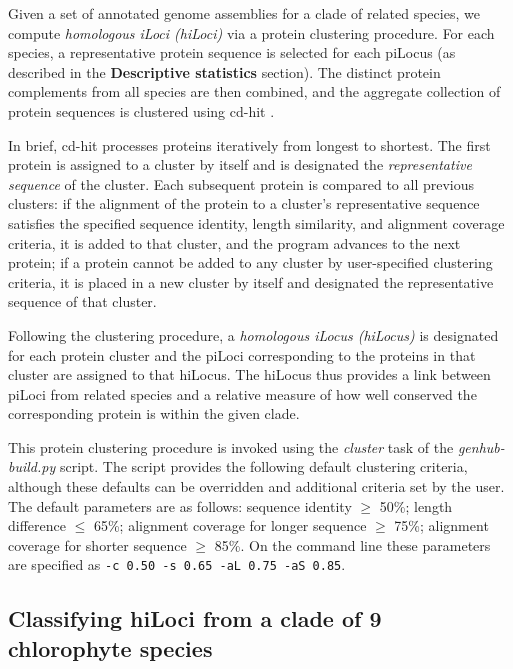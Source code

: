 Given a set of annotated genome assemblies for a clade of related species, we compute \textit{homologous iLoci (hiLoci)} via a protein clustering procedure.
For each species, a representative protein sequence is selected for each piLocus (as described in the \textbf{Descriptive statistics} section).
The distinct protein complements from all species are then combined, and the aggregate collection of protein sequences is clustered using cd-hit \cite{cdhit}.

In brief, cd-hit processes proteins iteratively from longest to shortest.
The first protein is assigned to a cluster by itself and is designated the \textit{representative sequence} of the cluster.
Each subsequent protein is compared to all previous clusters:
if the alignment of the protein to a cluster's representative sequence satisfies the specified sequence identity, length similarity, and alignment coverage criteria, it is added to that cluster, and the program advances to the next protein;
if a protein cannot be added to any cluster by user-specified clustering criteria, it is placed in a new cluster by itself and designated the representative sequence of that cluster.

Following the clustering procedure, a \textit{homologous iLocus (hiLocus)} is designated for each protein cluster and the piLoci corresponding to the proteins in that cluster are assigned to that hiLocus.
The hiLocus thus provides a link between piLoci from related species and a relative measure of how well conserved the corresponding protein is within the given clade.

This protein clustering procedure is invoked using the \textit{cluster} task of the \textit{genhub-build.py} script.
The script provides the following default clustering criteria, although these defaults can be overridden and additional criteria set by the user.
The default parameters are as follows: sequence identity $\geq$ 50\%; length difference $\leq$ 65\%; alignment coverage for longer sequence $\geq$ 75\%; alignment coverage for shorter sequence $\geq$ 85\%.
On the command line these parameters are specified as \texttt{-c 0.50 -s 0.65 -aL 0.75 -aS 0.85}.

\subsection*{Classifying hiLoci from a clade of 9 chlorophyte species}

